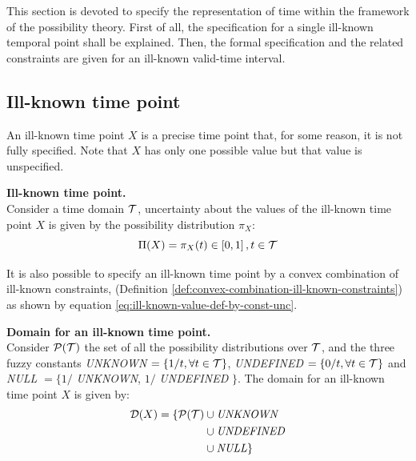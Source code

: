 %
%

This section is devoted to specify the representation of time within the framework of the possibility theory. First of all, the specification for a single ill-known temporal point shall be explained. Then, the formal specification and the related constraints are given for an ill-known valid-time interval.

\subsection{\label{subsec:ill-known-point-rep}Ill-known time point}
An ill-known time point $X$ is a precise time point that, for some reason, it is not fully specified. Note that $X$ has only one possible value but that value is unspecified.

\begin{definition}
\label{def:ill-known-time-point}
\textbf{Ill-known time point.}\\
Consider a time domain $\mathcal{T}$, uncertainty about the values of the ill-known time point $X$ is given by the possibility distribution $\pi_X$:
\begin{equation}
\label{eq:ill-known-time-point}
\Pi(X) = \pi_X(t) \in \left[0,1\right] , t \in \mathcal{T}
\end{equation}
\end{definition}

It is also possible to specify an ill-known time point by a convex combination of ill-known constraints, (Definition \ref{def:convex-combination-ill-known-constraints}) as shown by equation \eqref{eq:ill-known-value-def-by-const-unc}.



\begin{definition}
\label{def:ill-known-domain}
\textbf{Domain for an ill-known time point.}\\
Consider $\mathcal{P}(\mathcal{T})$ the set of all the possibility distributions over $\mathcal{T}$, and the three fuzzy constants \emph{UNKNOWN} $=\left\lbrace 1/t, \forall t \in \mathcal{T} \right\rbrace$, \emph{UNDEFINED} $=\left\lbrace 0/t,\forall t \in \mathcal{T} \right\rbrace$ and \emph{NULL} $=\lbrace 1/$ \emph{UNKNOWN}, $1/$ \emph{UNDEFINED} $\rbrace$. The domain for an ill-known time point $X$ is given by: 
\begin{align}
\label{eq:ill-known-domain}
\Dom (X) =  \lbrace \Pow(\T) & \cup \mbox{\emph{UNKNOWN}} \\
\nonumber
&\cup \mbox{\emph{UNDEFINED}} \\
\nonumber
&\cup \mbox{\emph{NULL}} \rbrace
%
\end{align}
\end{definition}




